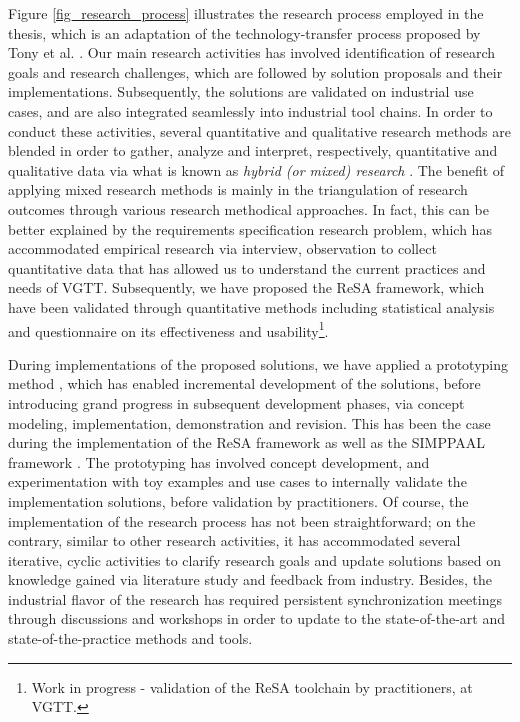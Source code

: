 Figure \ref{fig_research_process} illustrates the research process employed in the thesis, which is an adaptation of the technology-transfer process proposed by Tony et al. \cite{Gorschek2006APractice}. Our main research activities has involved identification of research goals and research challenges, which are followed by solution proposals and their implementations. Subsequently, the solutions are validated on industrial use cases, and are also integrated seamlessly into industrial tool chains. In order to conduct these activities, several quantitative and qualitative research methods are blended in order to gather, analyze and interpret, respectively, quantitative and qualitative data via what is known as \textit{hybrid (or mixed) research} \cite{Creswell2014ResearchApproaches}. The benefit of applying mixed research methods is mainly in the triangulation of research outcomes through various research methodical approaches. In fact, this can be better explained by the requirements specification research problem, which has accommodated empirical research via interview, observation to collect quantitative data that has allowed us to understand the current practices and needs of VGTT. Subsequently, we have proposed the ReSA framework, which have been validated through quantitative methods including statistical analysis and questionnaire on its effectiveness and usability\footnote{Work in progress - validation of the ReSA toolchain by practitioners, at VGTT.}.

During implementations of the proposed solutions, we have applied a prototyping method \cite{Carr2004PrototypingApproaches}, which has enabled incremental development of the solutions, before introducing grand progress in subsequent development phases, via concept modeling, implementation, demonstration and revision. This has been the case during the implementation of the ReSA framework \cite{resatool,Mahmud2017SpecificationLogic} as well as the SIMPPAAL framework \cite{Filipovikj2016SimulinkSystems}. The prototyping has involved concept development, and experimentation with toy examples and use cases to internally validate the implementation solutions, before validation by practitioners. Of course, the implementation of the research process has not been straightforward; on the contrary, similar to other research activities, it has accommodated several iterative, cyclic activities to clarify research goals and update solutions based on knowledge gained via literature study and feedback from industry.  Besides, the industrial flavor of the research has required persistent synchronization meetings through discussions and workshops in order to update to the state-of-the-art and state-of-the-practice methods and tools.

